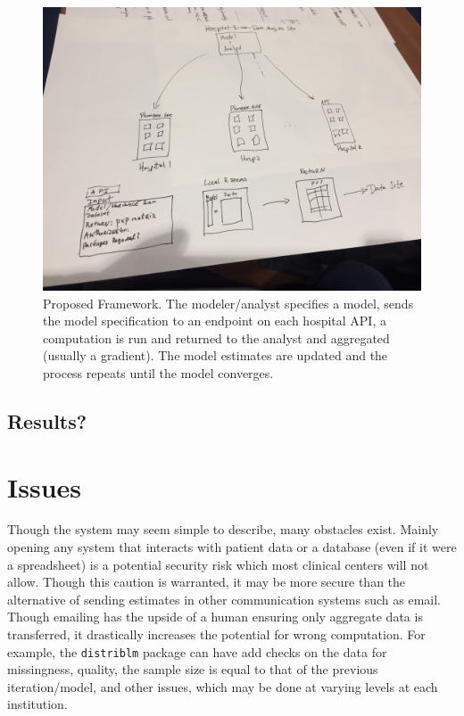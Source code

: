 \documentclass[]{elsarticle} %
\begin{document}
\begin{figure}
\includegraphics[width=1\linewidth]{sketch} \caption{Proposed Framework.  The modeler/analyst specifies a model, sends the model specification to an endpoint on each hospital API, a computation is run and returned to the analyst and aggregated (usually a gradient).  The model estimates are updated and the process repeats until the model converges.  }\label{fig:unnamed-chunk-1}
\end{figure}

\hypertarget{results}{%
\subsection{Results?}\label{results}}

\hypertarget{issues}{%
\section{Issues}\label{issues}}

Though the system may seem simple to describe, many obstacles exist.
Mainly opening any system that interacts with patient data or a database
(even if it were a spreadsheet) is a potential security risk which most
clinical centers will not allow. Though this caution is warranted, it
may be more secure than the alternative of sending estimates in other
communication systems such as email. Though emailing has the upside of a
human ensuring only aggregate data is transferred, it drastically
increases the potential for wrong computation. For example, the
\texttt{distriblm} package can have add checks on the data for
missingness, quality, the sample size is equal to that of the previous
iteration/model, and other issues, which may be done at varying levels
at each institution.
\end{document}
